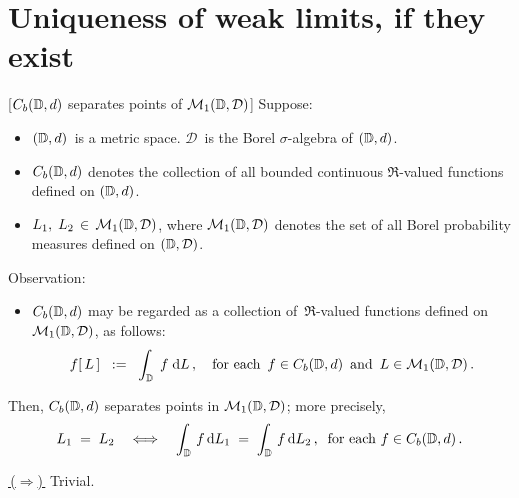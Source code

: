 

\section{Uniqueness of weak limits, if they exist}
\setcounter{theorem}{0}
\setcounter{equation}{0}


\renewcommand{\theenumi}{\roman{enumi}}
\renewcommand{\labelenumi}{\textnormal{(\theenumi)}$\;\;$}


\begin{theorem}\label{CbSeparatesPointsInM1DD}[$C_{b}(\mathbb{D},d)$ separates points of $\mathcal{M}_{1}(\mathbb{D},\mathcal{D})$]
\mbox{}\vskip 0.1cm
\noindent
Suppose:
\begin{itemize}
\item
	$(\mathbb{D},d)$\, is a metric space.
	$\mathcal{D}$\, is the Borel $\sigma$-algebra of $(\mathbb{D},d)$.
\item
	$C_{b}(\mathbb{D},d)$ denotes the collection of all bounded continuous $\Re$-valued functions defined on $(\mathbb{D},d)$.
\item
	$L_{1},\; L_{2} \,\in\, \mathcal{M}_{1}(\mathbb{D},\mathcal{D})$,
	where $\mathcal{M}_{1}(\mathbb{D},\mathcal{D})$ denotes the set of
	all Borel probability measures defined on $(\mathbb{D},\mathcal{D})$.
\end{itemize}
Observation:
\begin{itemize}
\item
	$C_{b}(\mathbb{D},d)$ may be regarded as a collection of \,$\Re$-valued functions
	defined on $\mathcal{M}_{1}(\mathbb{D},\mathcal{D})$, as follows:
	\begin{equation*}
	f\!\left[\,L\,\right]
	\;\; := \;\;
		\int_{\mathbb{D}}\; f\;\textnormal{d} L\,,
	\quad
	\textnormal{for each \,$f \in C_{b}(\mathbb{D},d)$\, and \,$L \in \mathcal{M}_{1}(\mathbb{D},\mathcal{D})$}\,.
	\end{equation*}
\end{itemize}
Then, $C_{b}(\mathbb{D},d)$ separates points in $\mathcal{M}_{1}(\mathbb{D},\mathcal{D})$;
more precisely,
\begin{equation*}
L_{1} \; = \; L_{2}
\quad\Longleftrightarrow\quad
	\int_{\mathbb{D}}\, f \,\textnormal{d} L_{1} \;=\; \int_{\mathbb{D}}\, f \,\textnormal{d} L_{2}\,,
	\;\;
	\textnormal{for each $f \in C_{b}(\mathbb{D},d)$}\,.
\end{equation*}
\end{theorem}
\proof
\vskip 0.1cm
\noindent
\underline{\,($\Longrightarrow$)\,}\;\;
Trivial.

